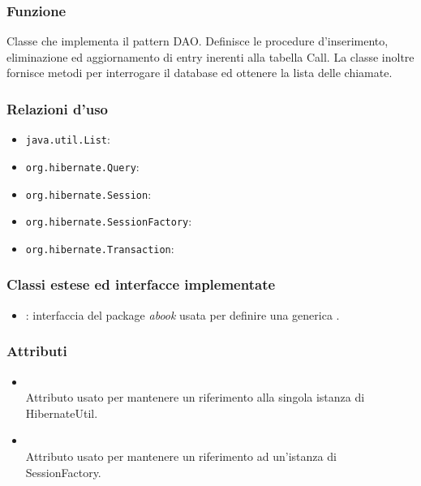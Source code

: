 
\subsubsection*{Funzione}
Classe che implementa il pattern DAO. Definisce le procedure d’inserimento, eliminazione ed aggiornamento di entry inerenti alla tabella Call. La classe inoltre fornisce metodi per interrogare il database ed ottenere la lista delle chiamate.

\subsubsection*{Relazioni d'uso}

\begin{itemize}
	\item \texttt{java.util.List}:
	\item \texttt{org.hibernate.Query}:
	\item \texttt{org.hibernate.Session}:
	\item \texttt{org.hibernate.SessionFactory}:
	\item \texttt{org.hibernate.Transaction}:
\end{itemize}

\subsubsection*{Classi estese ed interfacce implementate}
\begin{itemize}
	\item {}: interfaccia del package \textit{abook} usata per definire una generica .
\end{itemize}

\subsubsection*{Attributi}

\begin{itemize}
	\item{}\\
	Attributo usato per mantenere un riferimento alla singola istanza di HibernateUtil.
	\item{}\\
	Attributo usato per mantenere un riferimento ad un'istanza di SessionFactory.
\end{itemize}

